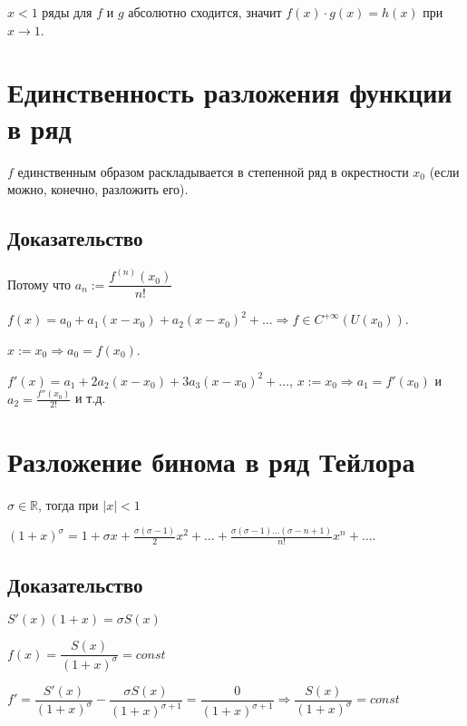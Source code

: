 \documentclass{article}
\begin{document}
                $x < 1$ ряды для $f$ и $g$ абсолютно сходится, значит $f(x) \cdot g(x) = h(x)$ при $x \rightarrow 1$.
                
    \newpage
    
    \section{Единственность разложения функции в ряд}
    
        $f$ единственным образом раскладывается в степенной ряд в окрестности $x_0$ (если можно, конечно, разложить его).
        
        \subsection{Доказательство}
        
            Потому что $a_n := \dfrac{f^{(n)}(x_0)}{n!}$
            
            $f(x) = a_0 + a_1(x - x_0) + a_2(x - x_0)^2 + \ldots \Rightarrow f \in C^{+\infty} \left( U(x_0) \right)$.
            
            $x := x_0 \Rightarrow a_0 = f(x_0)$.
            
            $f'(x) = a_1 + 2 a_2 (x - x_0) + 3 a_3 (x - x_0)^2 + \ldots$, $x := x_0 \Rightarrow a_1 = f'(x_0)$ и $a_2 = \frac{f''(x_0)}{2!}$ и т.д.
            
    \newpage
    
    \section{Разложение бинома в ряд Тейлора}
    
        $\sigma \in \mathbb{R}$, тогда при $|x| < 1$
        
        $(1 + x)^{\sigma} = 1 + \sigma x + \frac{\sigma (\sigma - 1)}{2}x^2 + \ldots + \frac{\sigma (\sigma - 1) \ldots (\sigma - n + 1)}{n!} x^n + \ldots$.
        
        \subsection{Доказательство}
        
            $S'(x)(1 + x) = \sigma S(x)$
            
            $f(x) = \dfrac{S(x)}{(1 + x)^{\sigma}} = const$
            
            $f' = \dfrac{S'(x)}{(1 + x)^{\sigma}} - \dfrac{\sigma S(x)}{(1 + x)^{\sigma + 1}} = \dfrac{0}{(1 + x)^{\sigma + 1}} \Rightarrow \dfrac{S(x)}{(1 + x)^{\sigma}} = const$
            
\end{document}
